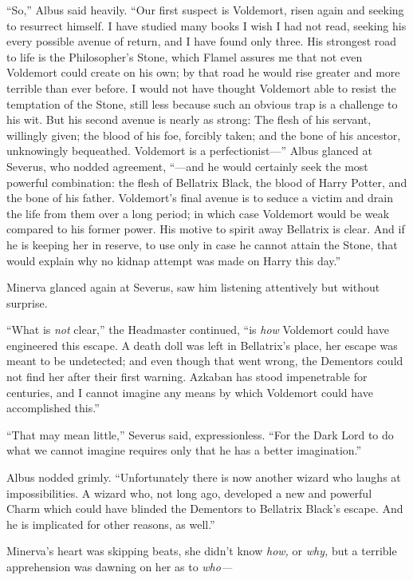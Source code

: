 ``So,'' Albus said heavily. ``Our first suspect is Voldemort, risen
again and seeking to resurrect himself. I have studied many books I wish
I had not read, seeking his every possible avenue of return, and I have
found only three. His strongest road to life is the Philosopher's Stone,
which Flamel assures me that not even Voldemort could create on his own;
by that road he would rise greater and more terrible than ever before. I
would not have thought Voldemort able to resist the temptation of the
Stone, still less because such an obvious trap is a challenge to his
wit. But his second avenue is nearly as strong: The flesh of his
servant, willingly given; the blood of his foe, forcibly taken; and the
bone of his ancestor, unknowingly bequeathed. Voldemort is a
perfectionist---'' Albus glanced at Severus, who nodded agreement,
``---and he would certainly seek the most powerful combination: the
flesh of Bellatrix Black, the blood of Harry Potter, and the bone of his
father. Voldemort's final avenue is to seduce a victim and drain the
life from them over a long period; in which case Voldemort would be weak
compared to his former power. His motive to spirit away Bellatrix is
clear. And if he is keeping her in reserve, to use only in case he
cannot attain the Stone, that would explain why no kidnap attempt was
made on Harry this day.''

Minerva glanced again at Severus, saw him listening attentively but
without surprise.

``What is \emph{not} clear,'' the Headmaster continued, ``is \emph{how}
Voldemort could have engineered this escape. A death doll was left in
Bellatrix's place, her escape was meant to be undetected; and even
though that went wrong, the Dementors could not find her after their
first warning. Azkaban has stood impenetrable for centuries, and I
cannot imagine any means by which Voldemort could have accomplished
this.''

``That may mean little,'' Severus said, expressionless. ``For the Dark
Lord to do what we cannot imagine requires only that he has a better
imagination.''

Albus nodded grimly. ``Unfortunately there is now another wizard who
laughs at impossibilities. A wizard who, not long ago, developed a new
and powerful Charm which could have blinded the Dementors to Bellatrix
Black's escape. And he is implicated for other reasons, as well.''

Minerva's heart was skipping beats, she didn't know \emph{how,} or
\emph{why,} but a terrible apprehension was dawning on her as to
\emph{who---}

